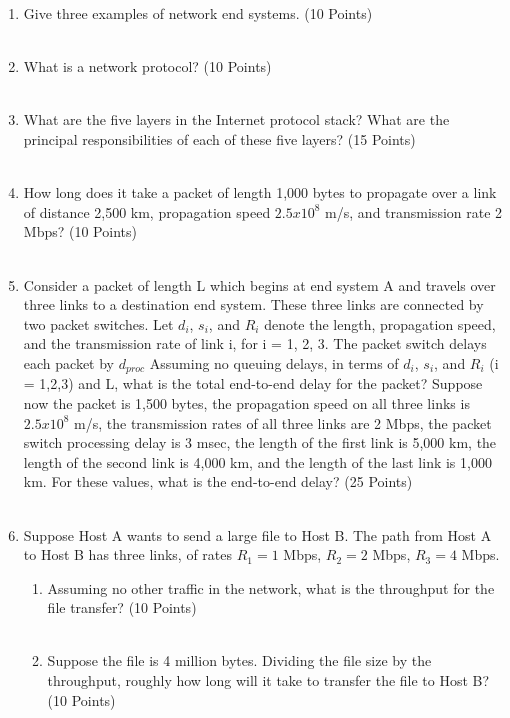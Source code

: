 \documentclass[12pt]{article}
\begin{document}
\begin{enumerate}
    \item Give three examples of network end systems. (10 Points) \\\\ \answerOne

    \item What is a network protocol? (10 Points) \\\\ \answerTwo

    \item What are the five layers in the Internet protocol stack? What are the principal
        responsibilities of each of these five layers? (15 Points) \\\\ \answerThree

    \item How long does it take a packet of length 1,000 bytes to propagate over a link of distance
        2,500 km, propagation speed \( 2.5x10^8 \) m/s, and transmission rate 2 Mbps? (10 Points) \\\\ \answerFour

    \item Consider a packet of length L which begins at end system A and travels over three links to
    a destination end system. These three links are connected by two packet switches. Let $d_i$, $s_i$, and $R_i$
    denote the length, propagation speed, and the transmission rate of link i, for i = 1, 2, 3.
    The packet switch delays each packet by $d_{proc}$ Assuming no queuing delays, in
    terms of $d_i$, $s_i$, and $R_i$ (i = 1,2,3)  and
    L, what is the total end-to-end delay for the packet?
    Suppose now the packet is 1,500 bytes, the propagation speed on all three links is $2.5x10^8$
    m/s, the transmission rates of all three links are 2 Mbps, the packet switch processing
    delay is 3 msec, the length of the first link is 5,000 km, the length of the second link is
    4,000 km, and the length of the last link is 1,000 km. For these values, what is the end-to-end delay? (25 Points) \\\\ \answerFive

    \item Suppose Host A wants to send a large file to Host B. The path from Host A to Host B has
    three links, of rates $R_1 = 1$ Mbps, $R_2 = 2$ Mbps, $R_3 = 4$ Mbps.
        \begin{enumerate}[label=(\alph*)]
            \item Assuming no other traffic in the network, what is the throughput for the file transfer? (10 Points) \\\\ \answerSixPartOne
            \item Suppose the file is 4 million bytes. Dividing the file size by the throughput, roughly
            how long will it take to transfer the file to Host B? (10 Points) \\ \answerSixPartTwo
        \end{enumerate}


\end{enumerate}
\end{document}
